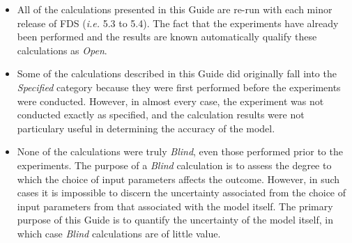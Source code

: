 \begin{itemize}
\item All of the calculations presented in this Guide are re-run with each minor release of FDS ({\em i.e.} 5.3 to 5.4). The
fact that the experiments have already been performed and the results are known automatically qualify these
calculations as {\em Open}.
\item Some of the calculations described in this Guide did originally fall into the {\em Specified} category because they
were first performed before the experiments were conducted. However, in almost every case, the experiment was not conducted
exactly as specified, and the calculation results were not particulary useful in determining the accuracy of the model.
\item None of the calculations were truly {\em Blind}, even those performed prior to the experiments. The purpose of a
{\em Blind} calculation is to assess the degree to which the choice of input parameters affects the outcome. However,
in such cases it is impossible to discern the uncertainty associated from the choice of input parameters from that associated
with the model itself. The primary purpose of this Guide is to quantify the uncertainty of the model itself, in which
case {\em Blind} calculations are of little value.
\end{itemize}
